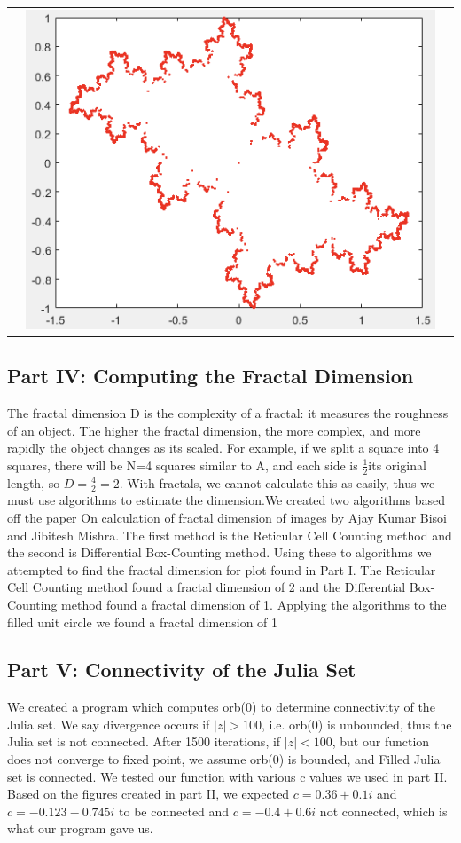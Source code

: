\documentclass[11pt]{article}
\theoremstyle{plain}
\theoremstyle{definition}
\begin{document}
\begin{tabular}{c c c}
&\includegraphics*[scale = 0.25]{Plot12.png} 
\end{tabular}


\subsection*{Part IV: Computing the Fractal Dimension}
The fractal dimension D is the complexity of a fractal: it measures the roughness of an object. The higher the fractal dimension, the more complex, and more rapidly the object changes as its scaled. For example, if we split a square into 4 squares, there will be N=4 squares similar to A, and each side is $ \frac{1}{2} $its original length, so $ D=\frac{4}{2}=2 $. With fractals, we cannot calculate this as easily, thus we must use algorithms to estimate the dimension.We created two algorithms based off the paper \underline{On calculation of fractal dimension of images } by Ajay Kumar Bisoi and Jibitesh Mishra. The first method is the Reticular Cell Counting method and the second is Differential Box-Counting method. Using these to algorithms we attempted to find the fractal dimension for plot found in Part I. The Reticular Cell Counting method found a fractal dimension of 2 and the Differential Box-Counting method found a fractal dimension of 1. Applying the algorithms to the filled unit circle we found a fractal dimension of 1

\subsection*{Part V: Connectivity of the Julia Set }
We created a program which computes orb(0) to determine connectivity of the Julia set. We say divergence occurs if $ |z| > 100 $, i.e. orb(0) is unbounded, thus the Julia set is not connected. After 1500 iterations, if $  |z |< 100 $, but our function does not converge to fixed point, we assume orb(0) is bounded, and Filled Julia set is connected. We tested our function with various c values we used in part II. Based on the figures created in part II, we expected $ c=0.36+0.1i $ and $ c=-0.123-0.745i $ to be connected and $ c=-0.4+0.6i $ not connected, which is what our program gave us.\\
\end{document}
